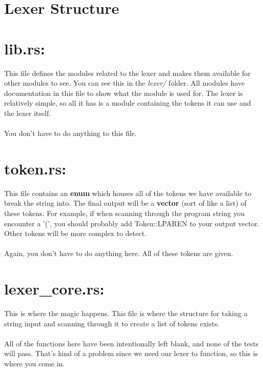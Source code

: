 \documentclass[
	12pt, %
]{fphw}
\begin{document}
\pagebreak

\section*{Lexer Structure}




\section*{lib.rs:}
This file defines the modules related to the lexer and makes them available for other modules to see. You can see this in the \textit{lexer/} folder. All modules have documentation in this file to show what the module is used for. The lexer is relatively simple, so all it has is a module containing the tokens it can use and the lexer itself.\\
\\
You don't have to do anything to this file.

\section*{token.rs:}
This file contains an \textbf{enum} which houses all of the tokens we have available to break the string into. The final output will be a \textbf{vector} (sort of like a list) of these tokens. For example, if when scanning through the program string you encounter a '(', you should probably add Token::LPAREN to your output vector. Other tokens will be more complex to detect.\\
\\
Again, you don't have to do anything here. All of these tokens are given.

\section*{lexer\_core.rs:}
This is where the magic happens. This file is where the structure for taking a string input and scanning through it to create a list of tokens exists. \\
\\
All of the functions here have been intentionally left blank, and none of the tests will pass. That's kind of a problem since we need our lexer to function, so this is where you come in. 
\end{document}
